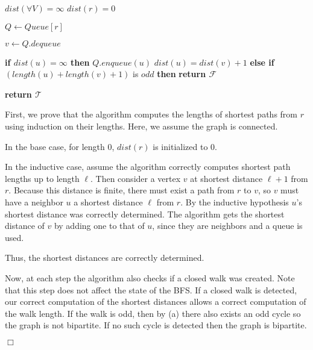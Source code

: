 \documentclass[10pt]{article}
\newenvironment{proof}{\par\noindent{\it Proof.}\hspace*{1em}}{$\Box$\bigskip}
\begin{document}
\begin{solution}
\begin{enumerate}[(a)]
{\begin{algorithm}[H]
\begin{algorithmic}[1]
                    \State $dist(\forall V) = \infty$
                    \State $dist(r) = 0$

                    \State $Q \gets Queue[r]$

                        \State $v \gets Q.dequeue$

                            \State \textbf{if $dist(u) = \infty$ then} 
                            \State \quad $Q.enqueue(u)$
                            \State \quad $dist(u) = dist(v) + 1$
                            \State \textbf{else if } $(length(u) + length(v) + 1)$ is $odd$ \textbf{then}
                            \State \quad \textbf{return $\mathcal{F}$} 
                        \EndFor
                    \EndWhile

                    \State \textbf{return $\mathcal{T}$}

                \end{algorithmic}
            \end{algorithm}

            \begin{proof}

                First, we prove that the algorithm computes the lengths of 
                shortest paths from $r$ using induction on their lengths. Here, 
                we assume the graph is connected. 

                In the base case, for length $0$, $dist(r)$ is initialized to $0$. 

                In the inductive case, assume the algorithm correctly computes 
                shortest path lengths up to length $\ell$. 
                Then consider a vertex $v$ at shortest distance $\ell + 1$ from 
                $r$. 
                Because this distance is finite, there must exist a path from 
                $r$ to $v$, so $v$ must have a neighbor $u$ a shortest distance 
                $\ell$ from $r$. 
                By the inductive hypothesis $u$'s shortest distance was 
                correctly determined. 
                The algorithm gets the shortest distance of $v$ by adding one to 
                that of $u$, since they are neighbors and a queue is used. 

                Thus, the shortest distances are correctly determined. 

                Now, at each step the algorithm also checks if a closed walk was 
                created. 
                Note that this step does not affect the state of the BFS. 
                If a closed walk is detected, our correct computation of the 
                shortest distances allows a correct computation of the walk 
                length. 
                If the walk is odd, then by (a) there also exists an odd cycle 
                so the graph is not bipartite. 
                If no such cycle is detected then the graph is bipartite. 


\end{proof}}
\end{enumerate}
\end{solution}
\end{document}
